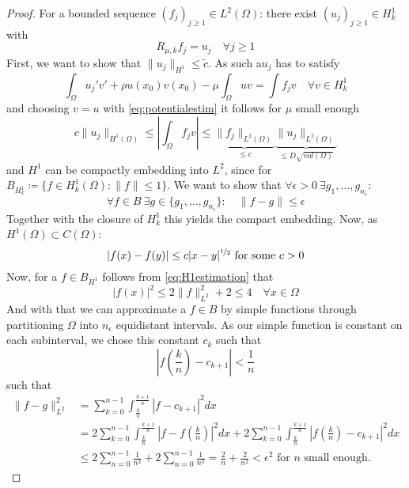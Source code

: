	\begin{proof}
	For a bounded sequence $(f_{j})_{j \geq 1} \in L^{2}(\Omega)$: there exist $(u_{j})_{j \geq 1} \in H^{1}_{k}$ with
		\[ R_{\mu, k} f_{j} = u_{j} \quad \forall j \geq 1 \]
	First, we want to show that $\| u_{j} \|_{H^{1}} \leq \tilde{c}$. As such a$u_{j}$ has to satisfy
		\[ \int_{\Omega} u_{j}' v' + \rho u(x_{0}) v(x_{0}) - \mu \int_{\Omega} u v = \int f_{j} v \quad \forall v \in H^{1}_{k} \]
	and choosing $v = u$ with \eqref{eq:potentialestim} it follows for $\mu$ small enough
		\[ c \| u_{j} \|_{H^{1}(\Omega)} \leq | \int_{\Omega} f_{j} v | \leq \underbrace{\| f_{j} \|_{L^{2}(\Omega)}}_{\leq c} \underbrace{\| u_{j} \|_{L^{2}(\Omega)}}_{\leq D \sqrt{vol(\Omega)}} \]
	and $H^{1}$ can be compactly embedding into $L^{2}$, since for $B_{H^{1}_{k}} \coloneqq \{ f \in H^{1}_{k}(\Omega) : \| f \| \leq 1 \}$. We want to show that $\forall \epsilon > 0 ~\exists g_{1}, \dotsc, g_{n_{\epsilon}}$:
	\[ \forall f \in B ~\exists g \in \{ g_{1}, \dotsc, g_{n_{\epsilon}} \} : \quad \| f - g \|\leq \epsilon \]
	Together with the closure of $H^{1}_{k}$ this yields the compact embedding. Now, as $H^1(\Omega) \subset C(\Omega)$: 
		\begin{equation}
			|f(x) - f(y)| \leq c |x - y|^{\nicefrac{1}{2}} \text{ for some } c > 0 \label{eq:H1estimation}
		\end{equation} 
		Now, for a $f \in B_{H^{1}}$ follows from \eqref{eq:H1estimation} that 
		\[ |f(x)|^{2} \leq 2 \| f \|^{2}_{L^{2}} + 2 \leq 4 \quad \forall x \in \Omega\]
		And with that we can approximate a $f \in B$ by simple functions through partitioning $\Omega$ into $n_{\epsilon}$ equidistant intervals. As our simple function is constant on each subinterval, we chose this constant $c_{k}$ such that
		\[ |f(\frac{k}{n}) - c_{k + 1}| < \frac{1}{n}  \]
		such that
		\begin{align*}
			\| f - g \|^{2}_{L^{2}} & = \sum_{k = 0}^{n-1} \int_{\frac{k}{n}}^{\frac{k+1}{n}} | f - c_{k+1} |^{2} dx \\
				& =  2 \sum_{k = 0}^{n-1} \int_{\frac{k}{n}}^{\frac{k+1}{n}} | f - f(\frac{k}{n}) |^{2} dx +  2 \sum_{k = 0}^{n-1} \int_{\frac{k}{n}}^{\frac{k+1}{n}} | f(\frac{k}{n}) - c_{k+1} |^{2} dx \\
				& \leq 2 \sum_{n = 0}^{n-1} \frac{1}{n^{2}} + 2 \sum_{n=0}^{n-1} \frac{1}{n^{3}} = \frac{2}{n} + \frac{2}{n^{2}} < \epsilon^{2} \text{ for } n \text{ small enough.}
		\end{align*}		
	\end{proof}	
		
